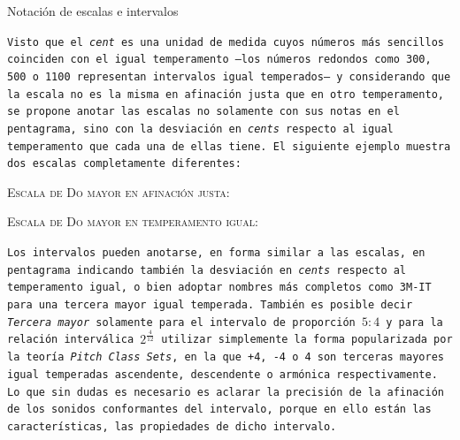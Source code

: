 \documentclass[a4paper,11pt]{article}
\begin{document}
  \begin{caja}{Notación de escalas e intervalos}
  { \label{caja:notacion-escalas} %
    \texttt{Visto que el \emph{cent} es una unidad de medida cuyos números más sencillos coinciden con el igual temperamento ---los números redondos como 300, 500 o 1100 representan intervalos igual temperados--- y considerando que la escala  no es la misma en afinación justa que en otro temperamento, se propone anotar las escalas no solamente con sus notas en el pentagrama, sino con la desviación en \emph{cents} respecto al igual temperamento que cada una de ellas tiene. El siguiente ejemplo muestra dos escalas completamente diferentes:}

    \begin{center}
      \textsc{Escala de Do mayor en afinación justa:}


      \bigskip

      \textsc{Escala de Do mayor en temperamento igual:}

    \end{center}

    \texttt{Los intervalos pueden anotarse, en forma similar a las escalas, en pentagrama indicando también la desviación en \emph{cents} respecto al temperamento igual, o bien adoptar nombres más completos como 3M-IT para una tercera mayor igual temperada. También es posible decir \emph{Tercera mayor} solamente para el intervalo de proporción $5:4$ y para la relación interválica $2^{\frac{4}{12}}$ utilizar simplemente la forma popularizada por la teoría \emph{Pitch Class Sets}, en la que +4, -4 o 4 son terceras mayores igual temperadas ascendente, descendente o armónica respectivamente. Lo que sin dudas es necesario es aclarar la precisión de la afinación de los sonidos conformantes del intervalo, porque en ello están las características, las propiedades de dicho intervalo.}
  }
  \end{caja}
\end{document}
